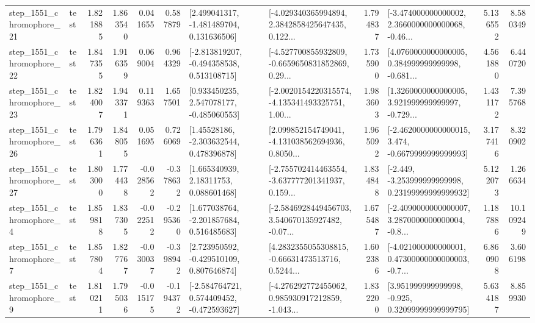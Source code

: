 \begin{tabular}{llrrrrllrlrr}
 step\_1551\_chromophore\_21 &      test &      1.821885 &    1.863540 &      0.041655 &  0.587879 &    [2.499041317, -1.481489704, 0.131636506] &  [-4.029340365994894, 2.3842858425647435, 0.122... &       1.794837 &  [-3.474000000000002, 2.3660000000000068, -0.46... &            5.136552 &          8.580349 \\
 step\_1551\_chromophore\_22 &      test &      1.847355 &    1.916359 &      0.069004 &  0.964329 &   [-2.813819207, -0.494358538, 0.513108715] &  [-4.527700855932809, -0.6659650831852869, 0.29... &       1.735900 &  [4.0760000000000005, 0.384999999999998, -0.681... &            4.561880 &          6.440720 \\
 step\_1551\_chromophore\_23 &      test &      1.824007 &    1.943371 &      0.119363 &  1.657501 &    [0.933450235, 2.547078177, -0.485060553] &  [-2.0020154220315574, -4.135341493325751, 1.00... &       1.983603 &  [1.3260000000000005, 3.921999999999997, -0.729... &            1.431172 &          7.395768 \\
 step\_1551\_chromophore\_26 &      test &      1.796361 &    1.848055 &      0.051695 &  0.726069 &     [1.45528186, -2.303632544, 0.478396878] &  [2.099852154749041, -4.131038562694936, 0.8050... &       1.965092 &  [-2.4620000000000015, 3.474, -0.6679999999999993] &            3.177416 &          8.320902 \\
 step\_1551\_chromophore\_27 &      test &      1.803000 &    1.774438 &     -0.028562 & -0.378632 &      [1.665340939, 2.18311753, 0.088601468] &  [-2.755702414463554, -3.637777201341937, 0.159... &       1.834848 &  [-2.449, -3.253999999999998, 0.23199999999999932] &            5.122073 &          1.266634 \\
  step\_1551\_chromophore\_4 &      test &      1.859818 &    1.837305 &     -0.022512 & -0.295360 &    [1.677038764, -2.201857684, 0.516485683] &  [-2.5846928449456703, 3.540670135927482, -0.07... &       1.675487 &  [-2.4090000000000007, 3.2870000000000004, -0.8... &            1.187886 &         10.109249 \\
  step\_1551\_chromophore\_7 &      test &      1.857804 &    1.827767 &     -0.030037 & -0.398942 &    [2.723950592, -0.429510109, 0.807646874] &  [4.2832355055308815, -0.66631473513716, 0.5244... &       1.602386 &  [-4.021000000000001, 0.47300000000000003, -0.7... &            6.860908 &          3.606198 \\
  step\_1551\_chromophore\_9 &      test &      1.810211 &    1.795036 &     -0.015175 & -0.194372 &   [-2.584764721, 0.574409452, -0.472593627] &  [-4.276292772455062, 0.985930917212859, -1.043... &       1.832200 &   [3.951999999999998, -0.925, 0.32099999999999795] &            5.634187 &          8.859930 \\

\end{tabular}
